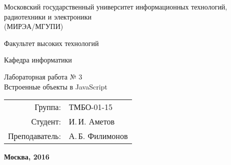 \begin{titlepage}
\begin{center} %

\bfseries

	{\Large Московский государственный университет информационных технологий, радиотехники и электроники \\
	(МИРЭА/МГУПИ)
	
	} %

\vspace{48pt}


	{\large 
	  Факультет высоких технологий
	}


\vspace{36pt}


	{\large  {\comic Кафедра информатики}
	
	} %

\vspace{48pt}

{\large	\DoloresCyr Лабораторная работа № 3 \\
  \LARGE{Встроенные объекты в JavaScript}
	
	}

\vspace{12pt}


\end{center} %

\vspace{60pt}

	\begin{flushright}
	  \begin{tabular}{rl}
            Группа: & ТМБО-01-15\\
			Студент: & И.\,И. Аметов \\
			Преподаватель: & А.\,Б. Филимонов \\
		\end{tabular}
	\end{flushright}

\vfill

	\begin{center} %
		\bfseries
		Москва, 2016
	\end{center}
	
\end{titlepage} 

